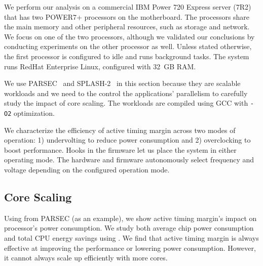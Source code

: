We perform our analysis on a commercial IBM Power 720 Express server (7R2) that has two POWER7+ processors on the motherboard. The processors share the main memory and other peripheral resources, such as storage and network. We focus on one of the two processors, although we validated our conclusions by conducting experiments on the other processor as well. Unless stated otherwise, the first processor is configured to idle and runs background tasks. The system runs RedHat Enterprise Linux, configured with 32~GB RAM. 

We use PARSEC~\cite{bienia2008parsec} and SPLASH-2~\cite{woo1995splash,bienia2008parsecsplash} in this section because they are scalable workloads and we need to the control the applications' parallelism to carefully study the impact of core scaling. The workloads are compiled using GCC with \texttt{-O2} optimization.

We characterize the efficiency of active timing margin across two modes of operation: 1) undervolting to reduce power consumption and 2) overclocking to boost performance. Hooks in the firmware let us place the system in either operating mode. The hardware and firmware autonomously select frequency and voltage depending on the configured operation mode.

\subsection{Core Scaling}
\label{sec:voltage:characterization:scaling-trends}
Using  from PARSEC (as an example), we show active timing margin's impact on processor's power consumption. We study both average chip power consumption and total CPU energy savings using . We find that active timing margin is always effective at improving the performance or lowering power consumption. However, it cannot always scale up efficiently with more cores. 

